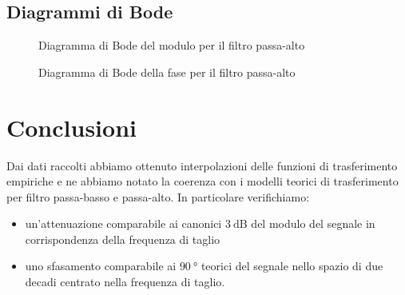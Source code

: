 \documentclass{article}
\begin{document}
\subsection{Diagrammi di Bode}

\begin{figure}[H]
  \caption{Diagramma di Bode del modulo per il filtro passa-alto}
\end{figure}
\begin{figure}[H]
  \caption{Diagramma di Bode della fase per il filtro passa-alto}
\end{figure}

\section{Conclusioni}
Dai dati raccolti abbiamo ottenuto interpolazioni delle funzioni di trasferimento empiriche 
e ne abbiamo notato la coerenza con i modelli teorici di trasferimento per filtro passa-basso e passa-alto.
In particolare verifichiamo:
\begin{itemize}
	\item un'attenuazione comparabile ai canonici $\SI{3}{\dB}$ del modulo del segnale in corrispondenza della frequenza di taglio  
	\item uno sfasamento comparabile ai $\SI{90}{\degree}$ teorici del segnale nello spazio di due decadi centrato nella frequenza di taglio.
\end{itemize}
\end{document}
